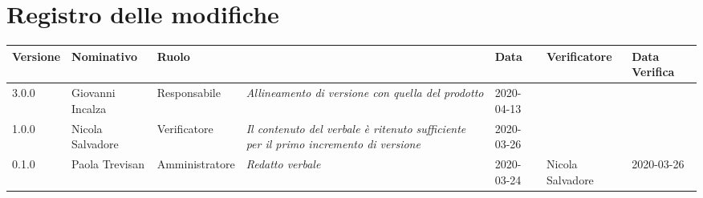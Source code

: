 \section*{Registro delle modifiche}
\renewcommand{\arraystretch}{1.8}

  \setlength\LTleft{-1.7cm}
  \begin{longtable}{|p{1.7cm}|p{2cm}|p{2.5cm}|p{3cm}|p{1.7cm}|p{2cm}|p{2.3cm}|}
    \hline

    \rowcolor{header}
    \textbf{Versione} & \textbf{Nominativo} & \textbf{Ruolo} & \centering{\textbf{Descrizione}} & \textbf{Data} & \textbf{Verificatore} & \textbf{Data Verifica}\\

    \hline
    3.0.0 & Giovanni Incalza & Responsabile & \small{\textit{Allineamento di versione con quella del prodotto}} & 2020-04-13 & &\\
    1.0.0 & Nicola Salvadore & Verificatore & \small{\textit{Il contenuto del verbale è ritenuto sufficiente per il primo incremento di versione}} & 2020-03-26 & &\\
	0.1.0 & Paola Trevisan & Amministratore & \small{\textit{Redatto verbale}} & 2020-03-24 & Nicola Salvadore & 2020-03-26 \\
    \hline
  \end{longtable}
  \setlength\LTleft{0cm}

